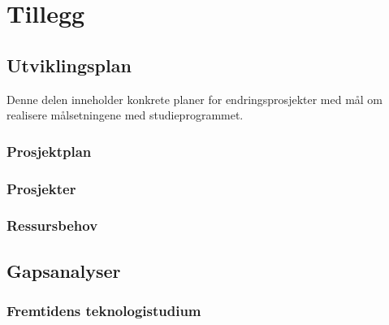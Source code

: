\documentclass[a4paper, oneside, 12pt]{memoir}
\begin{document}
\part*{Tillegg}



\chapter{Utviklingsplan}

Denne delen inneholder konkrete planer for endringsprosjekter med mål om realisere målsetningene med studieprogrammet.

\section{Prosjektplan}

	

\section{Prosjekter}
	
	
	





\section{Ressursbehov}


\chapter{Gapsanalyser}

\section{Fremtidens teknologistudium}
	
\end{document}
